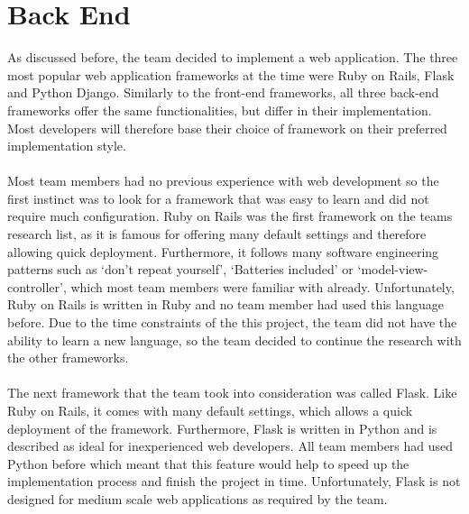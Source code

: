 \documentclass{l3proj}
\begin{document}
\section{Back End}
As discussed before, the team decided to implement a web application. The three most popular web application frameworks at the time were Ruby on Rails, Flask and Python Django. Similarly to the front-end frameworks, all three back-end frameworks offer the same functionalities, but differ in their implementation. Most developers will therefore base their choice of framework on their preferred implementation style.\\
\\Most team members had no previous experience with web development so the first instinct was to look for a framework that was easy to learn and did not require much configuration. Ruby on Rails was the first framework on the teams research list, as it is famous for offering many default settings and therefore allowing quick deployment. Furthermore, it follows many software engineering patterns such as `don't repeat yourself', `Batteries included' or `model-view-controller', which most team members were familiar with already. Unfortunately, Ruby on Rails is written in Ruby and no team member had used this language before. Due to the time constraints of the this project, the team did not have the ability to learn a new language, so the team decided to continue the research with the other frameworks.\\
\\The next framework that the team took into consideration was called Flask. Like Ruby on Rails, it comes with many default settings, which allows a quick deployment of the framework. Furthermore, Flask is written in Python and is described as ideal for inexperienced web developers. All team members had used Python before which meant that this feature would help to speed up the implementation process and finish the project in time. Unfortunately, Flask is not designed for medium scale web applications as required by the team.\\
\end{document}
